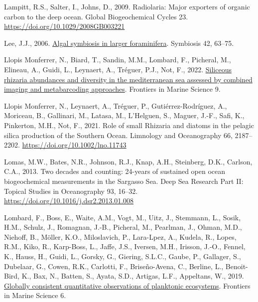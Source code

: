 \documentclass[
]{article}
\newlength{\cslhangindent}
\newlength{\cslentryspacingunit} %
\newenvironment{CSLReferences}[2] %
 {%
  \setlength{\parindent}{0pt}
  \ifodd #1
  \let\oldpar\par
  \def\par{\hangindent=\cslhangindent\oldpar}
  \fi
  \setlength{\parskip}{#2\cslentryspacingunit}
 }%
 {}
\begin{document}
\begin{CSLReferences}{1}{0}
\leavevmode{}%
Lampitt, R.S., Salter, I., Johns, D., 2009. Radiolaria: Major exporters
of organic carbon to the deep ocean. Global Biogeochemical Cycles 23.
\url{https://doi.org/10.1029/2008GB003221}

\leavevmode{}%
Lee, J.J., 2006.
\href{https://dalspace.library.dal.ca/bitstream/handle/10222/78255/VOLUME\%2042-NUMBER\%202-2006-PAGE\%2063.pdf?sequence=1}{Algal
symbiosis in larger foraminifera}. Symbiosis 42, 63--75.

\leavevmode{}%
Llopis Monferrer, N., Biard, T., Sandin, M.M., Lombard, F., Picheral,
M., Elineau, A., Guidi, L., Leynaert, A., Tréguer, P.J., Not, F., 2022.
\href{https://www.frontiersin.org/articles/10.3389/fmars.2022.895995}{Siliceous
rhizaria abundances and diversity in the mediterranean sea assessed by
combined imaging and metabarcoding approaches}. Frontiers in Marine
Science 9.

\leavevmode{}%
Llopis Monferrer, N., Leynaert, A., Tréguer, P., Gutiérrez-Rodríguez,
A., Moriceau, B., Gallinari, M., Latasa, M., L'Helguen, S., Maguer,
J.-F., Safi, K., Pinkerton, M.H., Not, F., 2021. Role of small Rhizaria
and diatoms in the pelagic silica production of the Southern Ocean.
Limnology and Oceanography 66, 2187--2202.
\url{https://doi.org/10.1002/lno.11743}

\leavevmode{}%
Lomas, M.W., Bates, N.R., Johnson, R.J., Knap, A.H., Steinberg, D.K.,
Carlson, C.A., 2013. Two decades and counting: 24-years of sustained
open ocean biogeochemical measurements in the Sargasso Sea. Deep Sea
Research Part II: Topical Studies in Oceanography 93, 16--32.
\url{https://doi.org/10.1016/j.dsr2.2013.01.008}

\leavevmode{}%
Lombard, F., Boss, E., Waite, A.M., Vogt, M., Uitz, J., Stemmann, L.,
Sosik, H.M., Schulz, J., Romagnan, J.-B., Picheral, M., Pearlman, J.,
Ohman, M.D., Niehoff, B., Möller, K.O., Miloslavich, P., Lara-Lpez, A.,
Kudela, R., Lopes, R.M., Kiko, R., Karp-Boss, L., Jaffe, J.S., Iversen,
M.H., Irisson, J.-O., Fennel, K., Hauss, H., Guidi, L., Gorsky, G.,
Giering, S.L.C., Gaube, P., Gallager, S., Dubelaar, G., Cowen, R.K.,
Carlotti, F., Briseño-Avena, C., Berline, L., Benoit-Bird, K., Bax, N.,
Batten, S., Ayata, S.D., Artigas, L.F., Appeltans, W., 2019.
\href{https://www.frontiersin.org/articles/10.3389/fmars.2019.00196}{Globally
consistent quantitative observations of planktonic ecosystems}.
Frontiers in Marine Science 6.


\end{CSLReferences}
\end{document}
